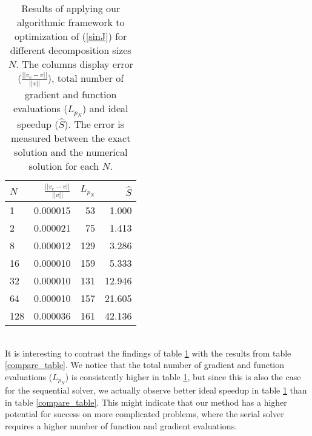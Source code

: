 \begin{table}
\caption{Results of applying our algorithmic framework to optimization of (\ref{sinJ}) for different decomposition sizes $N$. The columns display error ($\frac{||v_e-v||}{||v||}$), total number of gradient and function evaluations ($L_{p_N}$) and ideal speedup ($\hat S$). The error is measured between the exact solution and the numerical solution for each $N$.}
\centering
\label{unsmoothTab}
\begin{tabular}{lrrr}
\toprule
{} $N$&   $\frac{||v_e-v||}{||v||}$ &  $L_{p_N}$ &     $\hat S$ \\
\midrule
1   &  0.000015 &   53 &   1.000 \\
2   &  0.000021 &   75 &   1.413 \\
8   &  0.000012 &  129 &   3.286 \\
16  &  0.000010 &  159 &   5.333 \\
32  &  0.000010 &  131 &  12.946 \\
64  &  0.000010 &  157 &  21.605 \\
128 &  0.000036 &  161 &  42.136 \\
\bottomrule
\end{tabular}
\end{table}
\\
It is interesting to contrast the findings of table \ref{unsmoothTab} with the results from table \ref{compare_table}. We notice that the total number of gradient and function evaluations ($L_{p_N}$) is consistently higher in table \ref{unsmoothTab}, but since this is also the case for the sequential solver, we actually observe better ideal speedup in table \ref{unsmoothTab} than in table \ref{compare_table}. This might indicate that our method has a higher potential for success on more complicated problems, where the serial solver requires a higher number of function and gradient evaluations.

